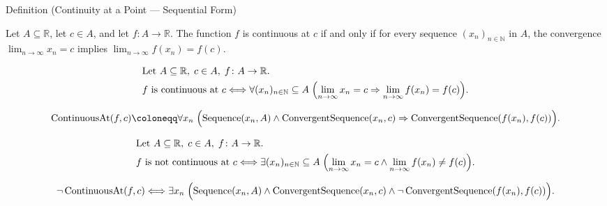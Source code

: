 \NoLocalDependencies

\begin{definitionbox}{Definition (Continuity at a Point --- Sequential Form)}
\begin{definition}
\label{def:continuous-at-point-seq}
Let $A \subseteq \mathbb{R}$, let $c \in A$, and let $f \colon A \to \mathbb{R}$. The function $f$ is continuous at $c$ if and only if for every sequence $(x_n)_{n\in\mathbb{N}}$ in $A$, the convergence $\lim_{n\to\infty} x_n = c$ implies $\lim_{n\to\infty} f(x_n) = f(c)$.
\end{definition}
\end{definitionbox}

\begin{remark*}
\[
\begin{aligned}
&\text{Let } A \subseteq \mathbb{R},\; c \in A,\; f \colon A \to \mathbb{R}.\\
&f \text{ is continuous at } c \Longleftrightarrow
\forall (x_n)_{n\in\mathbb{N}} \subseteq A\;
\Bigl(\lim_{n\to\infty} x_n = c \Rightarrow \lim_{n\to\infty} f(x_n) = f(c)\Bigr).
\end{aligned}
\]
\end{remark*}

\begin{remark*}
\[
\operatorname{ContinuousAt}(f,c) \coloneqq
\forall x_n\;
\Bigl(\operatorname{Sequence}(x_n, A) \land \operatorname{ConvergentSequence}(x_n, c)
\Rightarrow \operatorname{ConvergentSequence}(f(x_n), f(c))\Bigr).
\]
\end{remark*}

\begin{remark*}
\[
\begin{aligned}
&\text{Let } A \subseteq \mathbb{R},\; c \in A,\; f \colon A \to \mathbb{R}.\\
&f \text{ is not continuous at } c \Longleftrightarrow
\exists (x_n)_{n\in\mathbb{N}} \subseteq A\;
\Bigl(\lim_{n\to\infty} x_n = c \land \lim_{n\to\infty} f(x_n) \ne f(c)\Bigr).
\end{aligned}
\]
\end{remark*}

\begin{remark*}
\[
\neg\operatorname{ContinuousAt}(f,c) \Longleftrightarrow
\exists x_n\;
\Bigl(\operatorname{Sequence}(x_n, A) \land \operatorname{ConvergentSequence}(x_n, c)
\land \neg\operatorname{ConvergentSequence}(f(x_n), f(c))\Bigr).
\]
\end{remark*}


